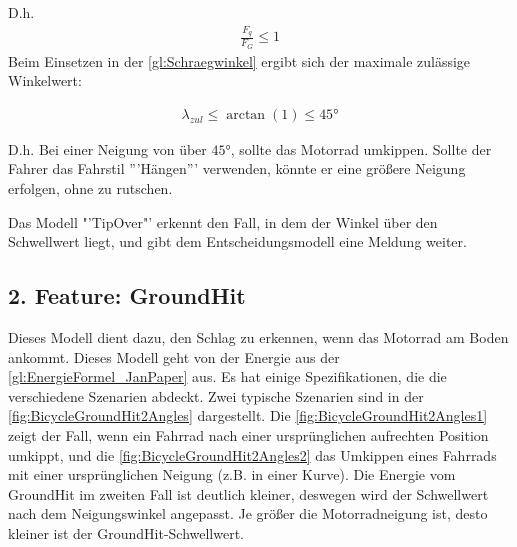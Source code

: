 D.h. 
\begin{align*}
	\frac{F_q}{F_G} \leq 1
\end{align*}
Beim Einsetzen in der \autoref{gl:Schraegwinkel} ergibt sich der maximale zulässige Winkelwert:

\begin{align*} \lambda_{zul} \leq \arctan(1) \leq \ang{45}\end{align*}

D.h. Bei einer Neigung von über $\ang{45}$, sollte das Motorrad umkippen. Sollte der Fahrer das Fahrstil '''Hängen''' verwenden, könnte er eine größere Neigung erfolgen, ohne zu rutschen.

Das Modell "'TipOver"' erkennt den Fall, in dem der Winkel über den Schwellwert liegt, und gibt dem Entscheidungsmodell eine Meldung weiter.



\subsection{2. Feature: GroundHit}
%
%
%
%

Dieses Modell dient dazu, den Schlag zu erkennen, wenn das Motorrad am Boden ankommt. Dieses Modell geht von der Energie aus der \autoref{gl:EnergieFormel_JanPaper} aus. Es hat einige Spezifikationen, die die verschiedene Szenarien abdeckt. Zwei typische Szenarien sind in der \autoref{fig:BicycleGroundHit2Angles} dargestellt. Die \autoref{fig:BicycleGroundHit2Angles1} zeigt der Fall, wenn ein Fahrrad nach einer ursprünglichen aufrechten Position umkippt, und die \autoref{fig:BicycleGroundHit2Angles2} das Umkippen eines Fahrrads mit einer ursprünglichen Neigung (z.B. in einer Kurve).
Die Energie vom GroundHit im zweiten Fall ist deutlich kleiner, deswegen wird der Schwellwert nach dem Neigungswinkel angepasst. Je größer die Motorradneigung ist, desto kleiner ist der GroundHit-Schwellwert.\\

